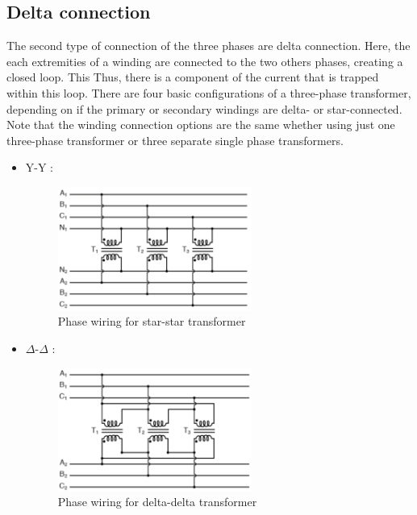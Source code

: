 \documentclass[12pt,a4paper]{report}
\begin{document}
\subsection{Delta connection}
The second type of connection of the three phases are delta connection. Here, the each extremities of a winding are connected to the two others phases, creating a closed loop. This  Thus, there is a component of the current that is trapped within this loop. 
There are four basic configurations of a three-phase transformer, depending on if the primary or secondary windings are delta- or star-connected. Note that the winding connection options are the same whether using just one three-phase transformer or three separate single phase transformers.
\begin{itemize}
    \item Y-Y :
    
    \begin{figure}[h]
    \centering
    \includegraphics[width=0.6\textwidth]{y-y.PNG}
    \caption{Phase wiring for star-star transformer}
    \label{fig:star-star transformer}
    \end{figure}
    
    \item $\Delta$-$\Delta$ :
       
    \begin{figure}[h]
    \centering
    \includegraphics[width=0.6\textwidth]{delta-delta.PNG}
    \caption{Phase wiring for delta-delta transformer}
    \label{fig:delta-delta transformer}
    \end{figure}
    

\end{itemize}
\end{document}

